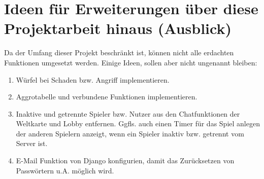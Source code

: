 \section{Ideen für Erweiterungen über diese Projektarbeit hinaus (Ausblick)} \label{ausblick}

Da der Umfang dieser Projekt beschränkt ist, können nicht alle erdachten Funktionen umgesetzt werden. Einige Ideen, sollen aber nicht ungenannt bleiben: 
\begin{enumerate}
    \item Würfel bei Schaden bzw. Angriff implementieren.
    \item Aggrotabelle und verbundene Funktionen implementieren.
    \item Inaktive und getrennte Spieler bzw. Nutzer aus den Chatfunktionen der Weltkarte und Lobby entfernen. Ggfls. auch einen Timer für das Spiel anlegen der anderen Spielern anzeigt, wenn ein Spieler inaktiv bzw. getrennt vom Server ist. 
    \item E-Mail Funktion von Django konfigurien, damit das Zurücksetzen von Passwörtern u.A. möglich wird.
\end{enumerate}

